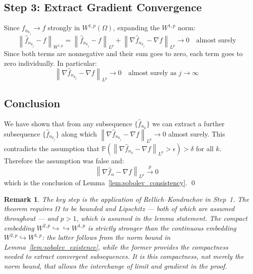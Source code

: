 \documentclass[12pt]{article}
\newtheorem{remark}{Remark}
\newcommand{\norm}[1]{\left\| #1 \right\|}
\newcommand{\Wonep}{W^{1,p}(\Omega)}
\newcommand{\fn}{\hat{f}_n}
\newcommand{\xrightarrowp}{\xrightarrow{p}}
\begin{document}
	\subsection{Step 3: Extract Gradient Convergence}
	
	Since $\hat{f}_{n_{k_j}} \to f$ strongly in $\Wonep$, expanding the
	$W^{1,p}$ norm:
	\begin{equation}
		\norm{\hat{f}_{n_{k_j}} - f}_{W^{1,p}}
		= \norm{\hat{f}_{n_{k_j}} - f}_{L^p}
		+ \norm{\nabla \hat{f}_{n_{k_j}} - \nabla f}_{L^p}
		\to 0
		\quad \text{almost surely}
	\end{equation}
	Since both terms are nonneg­ative and their sum goes to zero, each term goes
	to zero individually. In particular:
	\begin{equation}
		\norm{\nabla \hat{f}_{n_{k_j}} - \nabla f}_{L^p} \to 0
		\quad \text{almost surely as } j \to \infty
	\end{equation}
	
	\subsection{Conclusion}
	
	We have shown that from any subsequence $\{\hat{f}_{n_k}\}$ we can extract
	a further subsequence $\{\hat{f}_{n_{k_j}}\}$ along which
	$\norm{\nabla \hat{f}_{n_{k_j}} - \nabla f}_{L^p} \to 0$ almost surely.
	This contradicts the assumption that
	$\mathbb{P}(\norm{\nabla \hat{f}_{n_k} - \nabla f}_{L^p} > \epsilon) > \delta$
	for all $k$. Therefore the assumption was false and:
	\begin{equation}
		\norm{\nabla \fn - \nabla f}_{L^p} \xrightarrowp 0
	\end{equation}
	which is the conclusion of Lemma~\ref{lem:sobolev_consistency}. \qed
	
	\begin{remark}
		The key step is the application of Rellich--Kondrachov in Step~1. The
		theorem requires $\Omega$ to be bounded and Lipschitz --- both of which are
		assumed throughout --- and $p > 1$, which is assumed in the lemma statement.
		The compact embedding $W^{2,p} \hookrightarrow\hookrightarrow W^{1,p}$ is
		strictly stronger than the continuous embedding $W^{2,p} \hookrightarrow
		W^{1,p}$: the latter follows from the norm bound in
		Lemma~\ref{lem:sobolev_existence}, while the former provides the
		compactness needed to extract convergent subsequences. It is this
		compactness, not merely the norm bound, that allows the interchange of
		limit and gradient in the proof.
	\end{remark}
	
\end{document}
